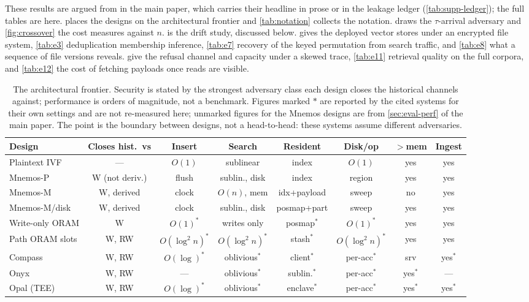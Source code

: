 \documentclass[10pt,journal,compsoc]{IEEEtran}
\begin{document}
These results are argued from in the main paper, which carries their headline in prose or in the
leakage ledger (\cref{tab:supp-ledger}); the full tables are here.  places the designs
on the architectural frontier and \cref{tab:notation} collects the notation.  draws
the $\tau$-arrival adversary and \cref{fig:crossover} the cost measures against $n$.  is
the drift study, discussed below.  gives the deployed vector stores under an encrypted
file system, \cref{tab:e3} deduplication membership inference, \cref{tab:e7} recovery of the keyed
permutation from search traffic, and \cref{tab:e8} what a sequence of file versions reveals.
 give the refusal channel and capacity under a skewed trace, \cref{tab:e11}
retrieval quality on the full corpora, and \cref{tab:e12} the cost of fetching payloads once reads
are visible.

\begin{table}[t]
\centering
\caption{The architectural frontier. Security is stated by the strongest adversary class each design
closes the historical channels against; performance is orders of magnitude, not a benchmark. Figures
marked $\ast$ are reported by the cited systems for their own settings and are not re-measured here;
unmarked figures for the Mnemos designs are from \cref{sec:eval-perf} of the main paper. The point is the boundary
between designs, not a head-to-head: these systems assume different adversaries.}
\label{tab:arch}
\scriptsize
\setlength{\tabcolsep}{3.5pt}
\begin{tabular}{lccccccc}
\toprule
Design & Closes hist.\ vs & Insert & Search & Resident & Disk/op & $>$mem & Ingest \\
\midrule
Plaintext IVF & --- & $O(1)$ & sublinear & index & $O(1)$ & yes & yes \\
Mnemos-P & W (not deriv.) & flush & sublin., disk & index & region & yes & yes \\
Mnemos-M & W, derived & clock & $O(n)$, mem & idx+payload & sweep & no & yes \\
Mnemos-M/disk & W, derived & clock & sublin., disk & posmap+part & sweep & yes & yes \\
Write-only ORAM & W & $O(1)^\ast$ & writes only & posmap$^\ast$ & $O(1)^\ast$ & yes & yes \\
Path ORAM slots & W, RW & $O(\log^2 n)^\ast$ & $O(\log^2 n)^\ast$ & stash$^\ast$ & $O(\log^2 n)^\ast$ & yes & yes \\
Compass & W, RW & $O(\log)^\ast$ & oblivious$^\ast$ & client$^\ast$ & per-acc$^\ast$ & srv & yes$^\ast$ \\
Onyx & W, RW & --- & oblivious$^\ast$ & sublin.$^\ast$ & per-acc$^\ast$ & yes$^\ast$ & --- \\
Opal (TEE) & W, RW & $O(\log)^\ast$ & oblivious$^\ast$ & enclave$^\ast$ & per-acc$^\ast$ & yes$^\ast$ & yes$^\ast$ \\
\bottomrule
\end{tabular}
\end{table}
\end{document}
